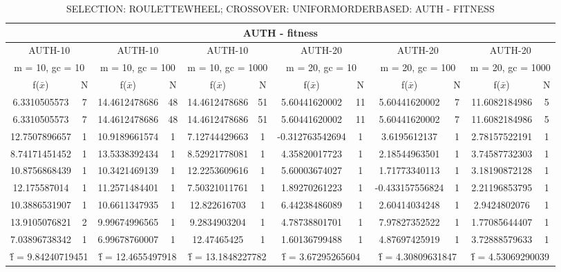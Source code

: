 

\begin{table}[H]
	\centering
	\caption{SELECTION: ROULETTEWHEEL; CROSSOVER: UNIFORMORDERBASED: AUTH - FITNESS}
	\vspace{5mm}
	\begin{adjustbox}{width=1\textwidth}
		\begin{tabular}{ |c|c||c|c||c|c||c|c||c|c||c|c| }
			\hline
			\multicolumn{12}{|c|}{AUTH - fitness} \\
			\hline
			\multicolumn{2}{|c||}{AUTH-10} & \multicolumn{2}{c||}{AUTH-10} & \multicolumn{2}{c||}{AUTH-10} & \multicolumn{2}{c||}{AUTH-20} & \multicolumn{2}{c||}{AUTH-20} & \multicolumn{2}{c|}{AUTH-20}\\
			\hline
			\multicolumn{2}{|c||}{m = 10, gc = 10} & \multicolumn{2}{c||}{m = 10, gc = 100} & \multicolumn{2}{c||}{m = 10, gc = 1000} & \multicolumn{2}{c||}{m = 20, gc = 10} & \multicolumn{2}{c||}{m = 20, gc = 100} & \multicolumn{2}{c|}{m = 20, gc = 1000}\\
			\hline
			f($\bar{x}$) & N & f($\bar{x}$) & N & f($\bar{x}$) & N & f($\bar{x}$) & N & f($\bar{x}$) & N & f($\bar{x}$) & N\\
			\hline
			\hline
			6.3310505573 & 7 & 14.4612478686 & 48 & 14.4612478686 & 51 & 5.60441620002 & 11 & 5.60441620002 & 7 & 11.6082184986 & 5\\
			\hline
			6.3310505573 & 7 & 14.4612478686 & 48 & 14.4612478686 & 51 & 5.60441620002 & 11 & 5.60441620002 & 7 & 11.6082184986 & 5\\
			12.7507896657 & 1 & 10.9189661574 & 1 & 7.12744429663 & 1 & -0.312763542694 & 1 & 3.6195612137 & 1 & 2.78157522191 & 1\\
			8.74171451452 & 1 & 13.5338392434 & 1 & 8.52921778081 & 1 & 4.35820017723 & 1 & 2.18544963501 & 1 & 3.74587732303 & 1\\
			10.8756868439 & 1 & 10.3421469139 & 1 & 12.2253609616 & 1 & 5.60003674027 & 1 & 1.71773340113 & 1 & 3.18190872128 & 1\\
			12.175587014 & 1 & 11.2571484401 & 1 & 7.50321011761 & 1 & 1.89270261223 & 1 & -0.433157556824 & 1 & 2.21196853795 & 1\\
			10.3886531907 & 1 & 10.6611347935 & 1 & 12.822616703 & 1 & 6.44238486089 & 1 & 2.60414034248 & 1 & 2.9424802076 & 1\\
			13.9105076821 & 2 & 9.99674996565 & 1 & 9.2834903204 & 1 & 4.78738801701 & 1 & 7.97827352522 & 1 & 1.77085644407 & 1\\
			7.03896738342 & 1 & 6.99678760007 & 1 & 12.47465425 & 1 & 1.60136799488 & 1 & 4.87697425919 & 1 & 3.72888579633 & 1\\
			\hline
			\multicolumn{2}{|c||}{\^{f} = 9.84240719451} & \multicolumn{2}{c||}{\^{f} = 12.4655497918} & \multicolumn{2}{c||}{\^{f} = 13.1848227782} & \multicolumn{2}{c||}{\^{f} = 3.67295265604} & \multicolumn{2}{c||}{\^{f} = 4.30809631847} & \multicolumn{2}{c|}{\^{f} = 4.53069290039}\\
			\hline
		\end{tabular}
	\end{adjustbox}
	\label{tab-3p-res1}
\end{table}

